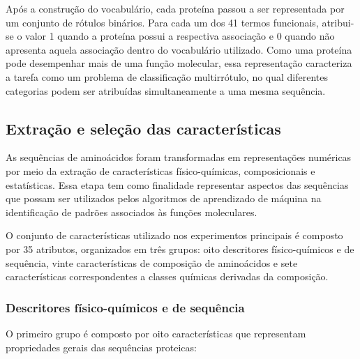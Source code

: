 Após a construção do vocabulário, cada proteína passou a ser representada por um conjunto de rótulos binários. Para cada um dos 41 termos funcionais, atribui-se o valor 1 quando a proteína possui a respectiva associação e 0 quando não apresenta aquela associação dentro do vocabulário utilizado. Como uma proteína pode desempenhar mais de uma função molecular, essa representação caracteriza a tarefa como um problema de classificação multirrótulo, no qual diferentes categorias podem ser atribuídas simultaneamente a uma mesma sequência.


\subsection{Extração e seleção das características}
\label{subsec:caracteristicas}

As sequências de aminoácidos foram transformadas em representações numéricas por meio da extração de características físico-químicas, composicionais e estatísticas. Essa etapa tem como finalidade representar aspectos das sequências que possam ser utilizados pelos algoritmos de aprendizado de máquina na identificação de padrões associados às funções moleculares.

O conjunto de características utilizado nos experimentos principais é composto por 35 atributos, organizados em três grupos: oito descritores físico-químicos e de sequência, vinte características de composição de aminoácidos e sete características correspondentes a classes químicas derivadas da composição.

\subsubsection{Descritores físico-químicos e de sequência}

O primeiro grupo é composto por oito características que representam propriedades gerais das sequências proteicas:

